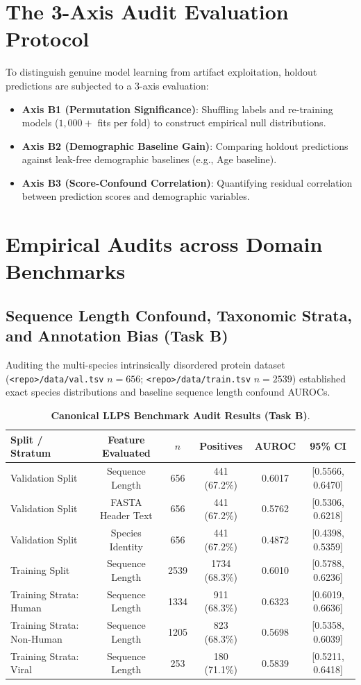 \documentclass[submittal,11pt]{article}
\begin{document}
\section{The 3-Axis Audit Evaluation Protocol}
To distinguish genuine model learning from artifact exploitation, holdout predictions are subjected to a 3-axis evaluation:
\begin{itemize}
    \item \textbf{Axis B1 (Permutation Significance)}: Shuffling labels and re-training models ($1,000+$ fits per fold) to construct empirical null distributions.
    \item \textbf{Axis B2 (Demographic Baseline Gain)}: Comparing holdout predictions against leak-free demographic baselines (e.g., Age baseline).
    \item \textbf{Axis B3 (Score-Confound Correlation)}: Quantifying residual correlation between prediction scores and demographic variables.
\end{itemize}

\section{Empirical Audits across Domain Benchmarks}

\subsection{Sequence Length Confound, Taxonomic Strata, and Annotation Bias (Task B)}
Auditing the multi-species intrinsically disordered protein dataset (\texttt{<repo>/data/val.tsv} $n=656$; \texttt{<repo>/data/train.tsv} $n=2539$) established exact species distributions and baseline sequence length confound AUROCs.

\begin{table}[htbp]
\centering
\caption{\textbf{Canonical LLPS Benchmark Audit Results (Task B)}.}
\label{tab:task_b}
\small
\begin{tabular}{lccccc}
\toprule
\textbf{Split / Stratum} & \textbf{Feature Evaluated} & \textbf{$n$} & \textbf{Positives} & \textbf{AUROC} & \textbf{95\% CI} \\
\midrule
Validation Split & Sequence Length & 656 & 441 (67.2\%) & 0.6017 & [0.5566, 0.6470] \\
Validation Split & FASTA Header Text & 656 & 441 (67.2\%) & 0.5762 & [0.5306, 0.6218] \\
Validation Split & Species Identity & 656 & 441 (67.2\%) & 0.4872 & [0.4398, 0.5359] \\
Training Split & Sequence Length & 2539 & 1734 (68.3\%) & 0.6010 & [0.5788, 0.6236] \\
Training Strata: Human & Sequence Length & 1334 & 911 (68.3\%) & 0.6323 & [0.6019, 0.6636] \\
Training Strata: Non-Human & Sequence Length & 1205 & 823 (68.3\%) & 0.5698 & [0.5358, 0.6039] \\
Training Strata: Viral & Sequence Length & 253 & 180 (71.1\%) & 0.5839 & [0.5211, 0.6418] \\
\bottomrule
\end{tabular}
\end{table}
\end{document}
